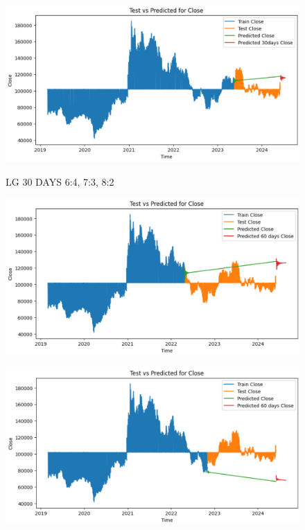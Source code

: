 \documentclass{article}
\begin{document}
\begin{multicols}{2}
\begin{figure}[H]
\begin{minipage}{0.15\textwidth}
    \label{fig:2}
    \end{minipage}%
    \begin{minipage}{0.15\textwidth}
    \centering
    \includegraphics[width=1\textwidth]{Image/VARMA/LG/8_2/30.png}

    \label{fig:3}
    \end{minipage}
    \caption{LG 30 DAYS  6:4, 7:3, 8:2 }
\end{figure}

\begin{figure}[H]
    \centering
    \begin{minipage}{0.15\textwidth}
    \centering
    \includegraphics[width=1\textwidth]{Image/VARMA/LG/6_4/60.png}
   
    \label{fig:1}
    \end{minipage}%
    \begin{minipage}{0.15\textwidth}
    \centering
    \includegraphics[width=1\textwidth]{Image/VARMA/LG/7_3/60.png}
  

\end{minipage}
\end{figure}
\end{multicols}
\end{document}
